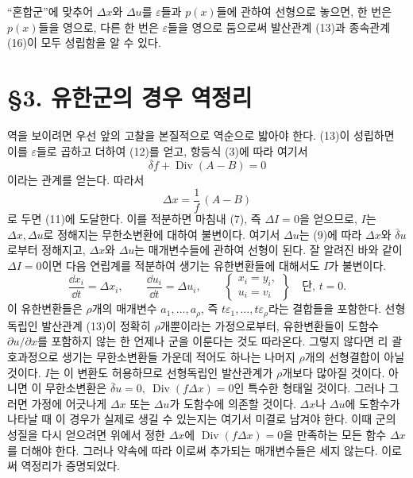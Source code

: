 ``혼합군''에 맞추어 \(\Delta x\)와 \(\Delta u\)를 \(\varepsilon\)들과 \(p(x)\)들에 관하여 선형으로 놓으면, 한 번은 \(p(x)\)들을 영으로, 다른 한 번은 \(\varepsilon\)들을 영으로 둠으로써 발산관계 (13)과 종속관계 (16)이 모두 성립함을 알 수 있다.

\bigskip
\section*{\S{}3. 유한군의 경우 역정리}

역을 보이려면 우선 앞의 고찰을 본질적으로 역순으로 밟아야 한다. (13)이 성립하면 이를 \(\varepsilon\)들로 곱하고 더하여 (12)를 얻고, 항등식 (3)에 따라 여기서
\[
\bar\delta f+\operatorname{Div}(A-B)=0
\]
이라는 관계를 얻는다. 따라서
\[
\Delta x=\frac1f\,(A-B)
\]
로 두면 (11)에 도달한다. 이를 적분하면 마침내 (7), 즉 \(\Delta I=0\)을 얻으므로, \(I\)는 \(\Delta x,\Delta u\)로 정해지는 무한소변환에 대하여 불변이다. 여기서 \(\Delta u\)는 (9)에 따라 \(\Delta x\)와 \(\bar\delta u\)로부터 정해지고, \(\Delta x\)와 \(\Delta u\)는 매개변수들에 관하여 선형이 된다. 잘 알려진 바와 같이 \(\Delta I=0\)이면 다음 연립계를 적분하여 생기는 유한변환들에 대해서도 \(I\)가 불변이다.
\begin{equation}
\tag{17}
\frac{\dd x_i}{\dd t}=\Delta x_i,\qquad
\frac{\dd u_i}{\dd t}=\Delta u_i,\qquad
\left\{\begin{array}{l}
x_i=y_i,\\
u_i=v_i
\end{array}\right\}
\quad\text{단, }t=0.
\end{equation}
이 유한변환들은 \(\rho\)개의 매개변수 \(a_1,\ldots,a_\rho\), 즉 \(t\varepsilon_1,\ldots,t\varepsilon_\rho\)라는 결합들을 포함한다. 선형독립인 발산관계 (13)이 정확히 \(\rho\)개뿐이라는 가정으로부터, 유한변환들이 도함수 \(\partial u/\partial x\)를 포함하지 않는 한 언제나 군을 이룬다는 것도 따라온다. 그렇지 않다면 리 괄호과정으로 생기는 무한소변환들 가운데 적어도 하나는 나머지 \(\rho\)개의 선형결합이 아닐 것이다. \(I\)는 이 변환도 허용하므로 선형독립인 발산관계가 \(\rho\)개보다 많아질 것이다. 아니면 이 무한소변환은 \(\bar\delta u=0,\ \operatorname{Div}(f\Delta x)=0\)인 특수한 형태일 것이다. 그러나 그러면 가정에 어긋나게 \(\Delta x\) 또는 \(\Delta u\)가 도함수에 의존할 것이다. \(\Delta x\)나 \(\Delta u\)에 도함수가 나타날 때 이 경우가 실제로 생길 수 있는지는 여기서 미결로 남겨야 한다. 이때 군의 성질을 다시 얻으려면 위에서 정한 \(\Delta x\)에 \(\operatorname{Div}(f\Delta x)=0\)을 만족하는 모든 함수 \(\Delta x\)를 더해야 한다. 그러나 약속에 따라 이로써 추가되는 매개변수들은 세지 않는다. 이로써 역정리가 증명되었다.

